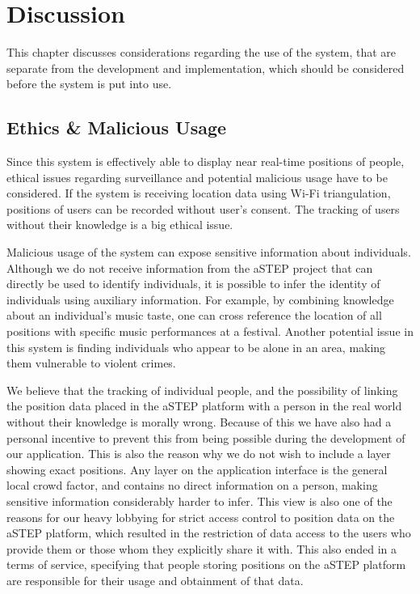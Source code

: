 \chapter{Discussion}\label{ch:discussion}

This chapter discusses considerations regarding the use of the system, that are separate from the development and implementation, which should be considered before the system is put into use.

\section{Ethics \& Malicious Usage}
Since this system is effectively able to display near real-time positions of people, ethical issues regarding surveillance and potential malicious usage have to be considered. If the system is receiving location data using Wi-Fi triangulation, positions of users can be recorded without user's consent. The tracking of users without their knowledge is a big ethical issue.

Malicious usage of the system can expose sensitive information about individuals. Although we do not receive information from the aSTEP project that can directly be used to identify individuals, it is possible to infer the identity of individuals using auxiliary information. For example, by combining knowledge about an individual's music taste, one can cross reference the location of all positions with specific music performances at a festival. Another potential issue in this system is finding individuals who appear to be alone in an area, making them vulnerable to violent crimes.

We believe that the tracking of individual people, and the possibility of linking the position data placed in the aSTEP platform with a person in the real world without their knowledge is morally wrong. Because of this we have also had a personal incentive to prevent this from being possible during the development of our application. This is also the reason why we do not wish to include a layer showing exact positions. Any layer on the application interface is the general local crowd factor, and contains no direct information on a person, making sensitive information considerably harder to infer. This view is also one of the reasons for our heavy lobbying for strict access control to position data on the aSTEP platform, which resulted in the restriction of data access to the users who provide them or those whom they explicitly share it with. This also ended in a terms of service, specifying that people storing positions on the aSTEP platform are responsible for their usage and obtainment of that data.

